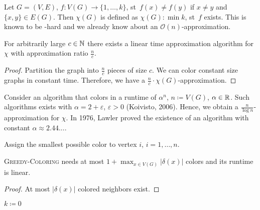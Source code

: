\documentclass[../skript.tex]{subfiles}
\begin{document}
Let $G = (V, E)$, $f : V(G) \to \{ 1, \ldots, k\}$, \ac{st}\ $f(x) \neq f(y)$ if $x \neq y$ and $\{ x, y \} \in E(G)$. Then $\chi(G)$ is defined as $\chi(G) : \min k$, \ac{st}\ $f$ exists. This is known to be \NP-hard and we already know about an $\mathcal{O}(n)$-approximation.
\begin{proposition} %
\label{prop:32}
For arbitrarily large $c \in \mathbb{N}$ there exists a linear time approximation algorithm for $\chi$ with approximation ratio $\frac{n}{c}$.
\end{proposition}
\begin{proof}
Partition the graph into $\frac{n}{c}$ pieces of size $c$. We can color constant size graphs in constant time. Therefore, we have a $\frac{n}{c} \cdot \chi(G)$-approximation.
\end{proof}
Consider an algorithm that colors in a runtime of $\alpha^n$, $n \coloneqq V(G)$, $\alpha \in \mathbb{R}$. Such algorithms exists with $\alpha = 2 + \varepsilon$, $\varepsilon > 0$ (Koivisto, 2006). Hence, we obtain a $\frac{n}{\log n}$-approximation for $\chi$. In 1976, Lawler proved the existence of an algorithm with constant $\alpha \approx 2.44...$.
\begin{algorithmbox}
\end{algorithmbox}
\vspace{-7pt}
\begin{algorithm}[H]
Assign the smallest possible color to vertex $i$, $i = 1, \ldots, n$.\;
\end{algorithm}
\vspace{-7pt}
\EndAlgorithmLine
\begin{theorem} %
\textsc{Greedy-Coloring} needs at most $1 + \max_{x \in V(G)} |\delta(x)|$ colors and its runtime is linear.
\end{theorem}
\begin{proof}
At most $|\delta(x)|$ colored neighbors exist.
\end{proof}
\begin{algorithmbox}
\end{algorithmbox}
\vspace{-7pt}
\begin{algorithm}[H]
$k \coloneqq 0$\;
\end{algorithm}
\vspace{-7pt}
\end{document}
